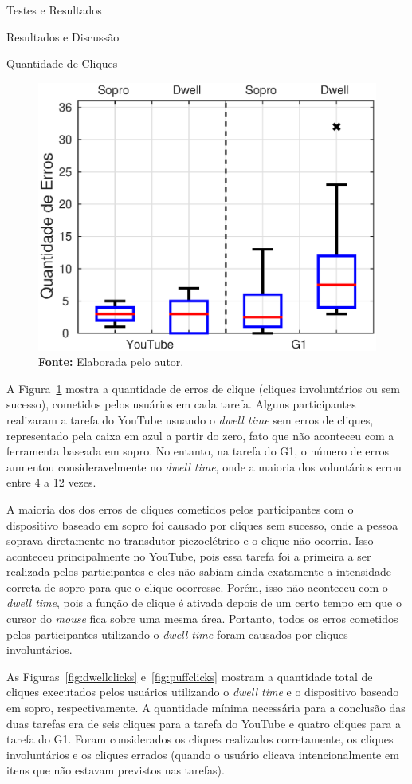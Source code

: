 \begin{chapter}{Testes e Resultados}
\begin{section}{Resultados e Discussão}
\begin{subsection}{Quantidade de Cliques}
\begin{figure}[!b]
	\centering
	\includegraphics[width=.65\linewidth]{fig/erros}
	\vspace{-0.7cm}
	\caption{Distribuição da quantidade de erros cometidos em cada tarefa.}
	\vspace{-1cm}
	\caption*{\textbf{Fonte: }Elaborada pelo autor.}
	\label{fig:cliques}
\end{figure}
A Figura~\ref{fig:cliques} mostra a quantidade de erros de clique (cliques
involuntários ou sem sucesso), cometidos pelos usuários em cada tarefa. Alguns
participantes realizaram a tarefa do YouTube usuando o \textit{dwell time} sem
erros de cliques, representado pela caixa em azul a partir do zero, fato que não
aconteceu com a ferramenta baseada em sopro. No entanto, na tarefa do G1, o
número de erros aumentou consideravelmente no \textit{dwell time}, onde a
maioria dos voluntários errou entre 4 a 12 vezes.


A maioria dos dos erros de cliques cometidos pelos participantes com o
dispositivo baseado em sopro foi causado por cliques sem sucesso, onde a pessoa
soprava diretamente no transdutor piezoelétrico e o clique não ocorria. Isso
aconteceu principalmente no YouTube, pois essa tarefa foi a primeira a ser
realizada pelos participantes e eles não sabiam ainda exatamente a intensidade
correta de sopro para que o clique ocorresse. Porém, isso não aconteceu com o
\textit{dwell time}, pois a função de clique é ativada depois de um certo
tempo em que o cursor do \textit{mouse} fica sobre uma mesma área. Portanto,
todos os erros cometidos pelos participantes utilizando o \textit{dwell time}
foram causados por cliques involuntários.

As Figuras~\ref{fig:dwellclicks} e~\ref{fig:puffclicks} mostram a quantidade
total de cliques executados pelos usuários utilizando o \textit{dwell time} e o
dispositivo baseado em sopro, respectivamente. A quantidade mínima necessária
para a conclusão das duas tarefas era de seis cliques para a tarefa do YouTube e
quatro cliques para a tarefa do G1. Foram considerados os cliques
realizados corretamente, os cliques involuntários e os
cliques errados (quando o usuário clicava intencionalmente em itens que não
estavam previstos nas tarefas).


\end{subsection}
\end{section}
\end{chapter}
